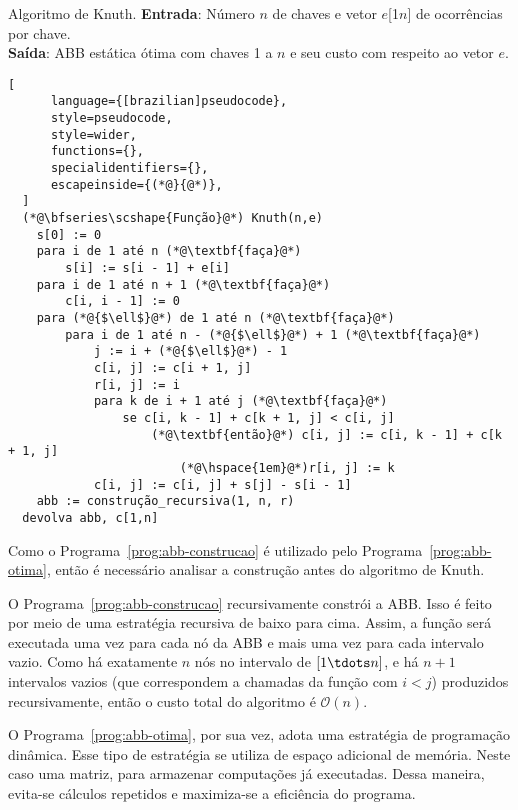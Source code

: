 \begin{programruledcaption}{Algoritmo de Knuth.\label{prog:abb-otima}}
  \noindent\textbf{Entrada}: Número $n$ de chaves e vetor $e$[1\tdots$n$] de ocorrências por chave. \\
  \textbf{Saída}: ABB estática ótima com chaves 1 a $n$ e seu custo com respeito ao vetor $e$.
  \vspace{-0.5\baselineskip}
  \begin{lstlisting}[
      language={[brazilian]pseudocode},
      style=pseudocode,
      style=wider,
      functions={},
      specialidentifiers={},
      escapeinside={(*@}{@*)},
  ]
  (*@\bfseries\scshape{Função}@*) Knuth(n,e)
    s[0] := 0
    para i de 1 até n (*@\textbf{faça}@*)
        s[i] := s[i - 1] + e[i]
    para i de 1 até n + 1 (*@\textbf{faça}@*)
        c[i, i - 1] := 0
    para (*@{$\ell$}@*) de 1 até n (*@\textbf{faça}@*)
        para i de 1 até n - (*@{$\ell$}@*) + 1 (*@\textbf{faça}@*)
            j := i + (*@{$\ell$}@*) - 1
            c[i, j] := c[i + 1, j]
            r[i, j] := i
            para k de i + 1 até j (*@\textbf{faça}@*)
                se c[i, k - 1] + c[k + 1, j] < c[i, j]
                    (*@\textbf{então}@*) c[i, j] := c[i, k - 1] + c[k + 1, j]
                        (*@\hspace{1em}@*)r[i, j] := k
            c[i, j] := c[i, j] + s[j] - s[i - 1]
    abb := construção_recursiva(1, n, r)
  devolva abb, c[1,n]
  \end{lstlisting}
  \vspace{-0.5\baselineskip}
\end{programruledcaption}

Como o Programa~\ref{prog:abb-construcao} é utilizado pelo Programa~\ref{prog:abb-otima}, então é necessário analisar a construção antes do algoritmo de Knuth.

O Programa~\ref{prog:abb-construcao} recursivamente constrói a ABB. Isso é feito por meio de uma estratégia recursiva de baixo para cima. Assim, a função será executada uma vez para cada nó da ABB e mais uma vez para cada intervalo vazio. Como há exatamente $n$ nós no intervalo de $[1 \tdots n]$, e há $n+1$ intervalos vazios (que correspondem a chamadas da função com $i<j$) produzidos recursivamente, então o custo total do algoritmo é \( \mathcal{O}(n) \).

O Programa~\ref{prog:abb-otima}, por sua vez, adota uma estratégia de programação dinâmica. Esse tipo de estratégia se utiliza de espaço adicional de memória. Neste caso uma matriz, para armazenar computações já executadas. Dessa maneira, evita-se cálculos repetidos e maximiza-se a eficiência do programa.

